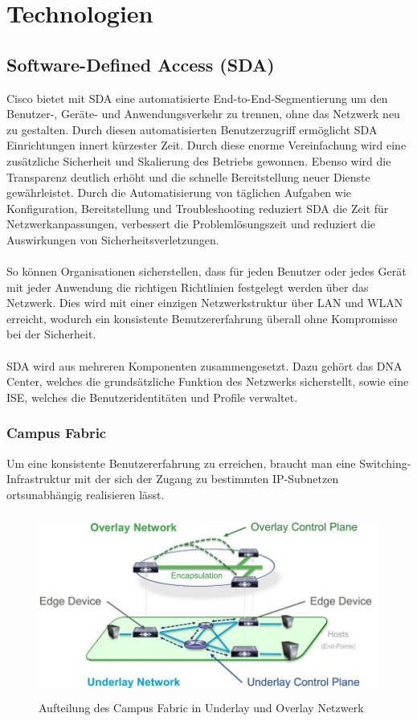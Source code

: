 \section{Technologien}

\subsection{Software-Defined Access (SDA)}
Cisco bietet mit SDA eine automatisierte End-to-End-Segmentierung um den Benutzer-, Geräte- und Anwendungsverkehr zu trennen, ohne das Netzwerk neu zu gestalten. Durch diesen automatisierten Benutzerzugriff ermöglicht SDA Einrichtungen innert kürzester Zeit. Durch diese enorme Vereinfachung wird eine zusätzliche Sicherheit und Skalierung des Betriebs gewonnen. Ebenso wird die Transparenz deutlich erhöht und die schnelle Bereitstellung neuer Dienste gewährleistet. Durch die Automatisierung von täglichen Aufgaben wie Konfiguration, Bereitstellung und Troubleshooting reduziert SDA die Zeit für Netzwerkanpassungen, verbessert die Problemlösungszeit und reduziert die Auswirkungen von Sicherheitsverletzungen.\\
\\
So können Organisationen sicherstellen, dass für jeden Benutzer oder jedes Gerät mit jeder Anwendung die richtigen Richtlinien festgelegt werden über das Netzwerk. Dies wird mit einer einzigen Netzwerkstruktur über LAN und WLAN erreicht, wodurch ein konsistente Benutzererfahrung überall ohne Kompromisse bei der Sicherheit. \\
\\
SDA wird aus mehreren Komponenten zusammengesetzt. Dazu gehört das DNA Center, welches die grundsätzliche Funktion des Netzwerks sicherstellt, sowie eine ISE, welches die Benutzeridentitäten und Profile verwaltet. \cite{sda-definition}

\subsubsection{Campus Fabric} \label{CampusFabric}
Um eine konsistente Benutzererfahrung zu erreichen, braucht man eine Switching-Infrastruktur mit der sich der Zugang zu bestimmten IP-Subnetzen ortsunabhängig realisieren lässt. \cite{campusfabric-introduction} \\

\begin{figure}[H]
	\centering
	\includegraphics[height=6cm]{img/campusfabric.jpg}
	\caption{Aufteilung des Campus Fabric in Underlay und Overlay Netzwerk \cite{sda-1-0-whitepaper}}
	\label{fig:Campus Fabric}
\end{figure}

